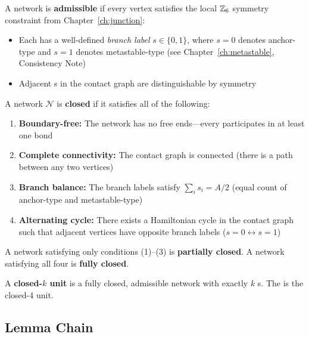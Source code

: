 \begin{definition} \tagDef
    A \Junction{} network is \textbf{admissible} if every vertex satisfies the
    local $\mathbb{Z}_6$ symmetry constraint from Chapter~\ref{ch:junction}:
    \begin{itemize}
        \item Each \Junction{} has a well-defined \emph{branch label} $s \in \{0, 1\}$,
              where $s = 0$ denotes anchor-type and $s = 1$ denotes metastable-type
              (see Chapter~\ref{ch:metastable}, Consistency Note)
        \item Adjacent \Junction{}s in the contact graph are distinguishable by symmetry
    \end{itemize}
\end{definition}

\begin{definition} \tagDef
    \label{def:closure}
    A \Junction{} network $\mathcal{N}$ is \textbf{closed} if it satisfies all of
    the following:
    \begin{enumerate}
        \item \textbf{Boundary-free:} The network has no free ends---every
              \Junction{} participates in at least one \Pinning{} bond
        \item \textbf{Complete connectivity:} The contact graph is connected
              (there is a path between any two vertices)
        \item \textbf{Branch balance:} The branch labels satisfy
              $\sum_i s_i = A/2$ (equal count of anchor-type and metastable-type)
        \item \textbf{Alternating cycle:} There exists a Hamiltonian cycle in
              the contact graph such that adjacent vertices have opposite branch
              labels ($s = 0 \leftrightarrow s = 1$)
    \end{enumerate}
    A network satisfying only conditions (1)--(3) is \textbf{partially closed}.
    A network satisfying all four is \textbf{fully closed}. \tagDef
\end{definition}

\begin{definition} \tagDef
    A \textbf{closed-$k$ unit} is a fully closed, admissible \Junction{} network
    with exactly $k$ \Constituent{}s. The \ClosedFour{} is the closed-4 unit. \tagDef
\end{definition}

\subsection{Lemma Chain}
\label{sec:he4:min:lemmas}

